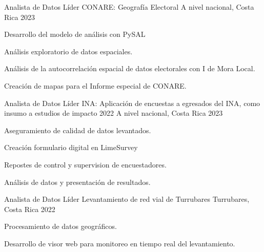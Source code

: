 

\begin{cventries}
\cventry
{Analista de Datos Líder} %
{CONARE: Geografía Electoral} %
{A nivel nacional, Costa Rica} %
{2023} %
{
  \begin{cvitems} %
    \item Desarrollo del modelo de análisis con PySAL
    \item Análisis exploratorio de datos espaciales.
    \item Análisis de la autocorrelación espacial de datos electorales
    con I de Mora Local.
    \item Creación de mapas para el Informe especial de CONARE.
  \end{cvitems}
}
\cventry
{Analista de Datos Líder} %
{INA: Aplicación de encuestas a egresados del INA, como insumo a estudios de impacto 2022} %
{A nivel nacional, Costa Rica} %
{2023} %
{
  \begin{cvitems} %
    \item Aseguramiento de calidad de datos levantados.
    \item Creación formulario digital en LimeSurvey
    \item Repostes de control y supervision de encuestadores.
    \item Análisis de datos y presentación de resultados.
  \end{cvitems}
}
\cventry
{Analista de Datos Líder} %
{Levantamiento de red vial de Turrubares} %
{Turrubares, Costa Rica} %
{2022} %
{
  \begin{cvitems} %
    \item Procesamiento de datos geográficos.
    \item Desarrollo de visor web para monitoreo en tiempo real del levantamiento.

\end{cvitems}}
\end{cventries}
